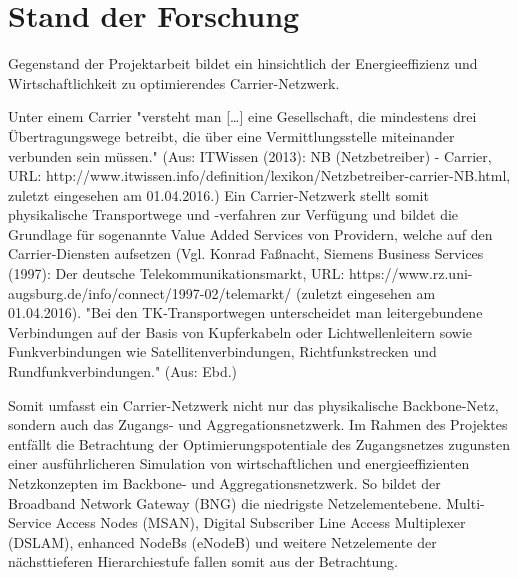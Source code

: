 \documentclass[12pt,titlepage]{article}
\newcommand{\firstpages}{

     \newpage
     \tableofcontents{}
     \addtocontents{toc}{~\hfill\textbf{Seite}\par}

     \newpage
     \listoffigures

     \newpage
     \listoftables
     \newpage
}
\begin{document}
\firstpages
\section{Stand der Forschung}
Gegenstand der Projektarbeit bildet ein hinsichtlich der Energieeffizienz und Wirtschaftlichkeit zu optimierendes Carrier-Netzwerk.

Unter einem Carrier "versteht man […] eine Gesellschaft, die mindestens drei Übertra\-gungs\-wege betreibt, die über eine Vermittlungsstelle miteinander verbunden sein müssen." (Aus: ITWissen (2013): NB (Netzbetreiber) - Carrier, URL: http://www.itwissen.info/definition/lexikon/Netzbetreiber-carrier-NB.html, zuletzt eingesehen am 01.04.2016.) Ein Carrier-Netzwerk stellt somit physikalische Transportwege und -verfahren zur Verfügung und bildet die Grundlage für sogenannte Value Added Services von Providern, welche auf den Carrier-Diensten aufsetzen (Vgl. Konrad Faßnacht, Siemens Business Services (1997): Der deutsche Telekommunikationsmarkt, URL: https://www.rz.uni-augsburg.de/info/connect/1997-02/telemarkt/ (zuletzt eingesehen am 01.04.2016). "Bei den TK-Transportwegen unterscheidet man leitergebundene Verbindungen auf der Basis von Kupferkabeln oder Lichtwellenleitern sowie Funkverbindungen wie Satellitenverbindungen, Richtfunkstrecken und Rundfunkverbindungen." (Aus: Ebd.)\cite{NICK2016}

Somit umfasst ein Carrier-Netzwerk nicht nur das physikalische Backbone-Netz, sondern auch das Zugangs- und Aggregationsnetzwerk. Im Rahmen des Projektes entfällt die Betrachtung der Optimierungspotentiale des Zugangsnetzes zugunsten einer aus\-führ\-lich\-eren Simulation von wirtschaftlichen und energieeffizienten Netzkonzepten im Backbone- und Aggregationsnetzwerk. So bildet der Broadband Network Gateway (BNG) die niedrigste Netzelementebene. Multi-Service Access Nodes (MSAN), Digital Subscriber Line Access Multiplexer (DSLAM), enhanced NodeBs (eNodeB) und weitere Netzelemente der nächsttieferen Hierarchiestufe fallen somit aus der Betrachtung.
\end{document}
